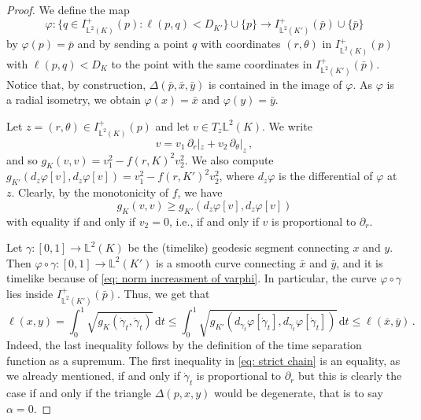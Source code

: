 \documentclass[hidelinks,12pt,a4paper]{article}
\numberwithin{equation}{section}
\theoremstyle{plain}
\theoremstyle{definition}
\renewcommand{\d}{\,\mathrm{d}}
\newcommand{\p}{\partial}
\newcommand{\lm}[1]{\mathbb{L}^2(#1)}
\newcommand*{\bx}{\bar{x}}
\newcommand*{\by}{\bar{y}}
\newcommand*{\bp}{\bar{p}}
\renewcommand{\d}{\,\mathrm{d}}
\begin{document}
\begin{proof}
We define the map 
\begin{equation*}
\varphi: \{q \in I^+_{\lm{K}}(p) : \ell(p,q) < D_{K'}\} \cup \{p\}  \to I^+_{\lm{K'}}(\bp) \cup \{\bp\}
\end{equation*}
by $\varphi(p)=\bp$ and by sending a point $q$ with coordinates $(r,\theta)$ in $I^+_{\lm{K}}(p)$ with $\ell(p,q) < D_{K}$ to the point with the same coordinates in $I^+_{\lm{K'}}(\bp)$. 
Notice that, by construction, $\Delta(\bp,\bx,\by)$ is contained in the image of $\varphi$. 
As $\varphi$ is a radial isometry, we obtain $\varphi(x)=\bx$ and $\varphi(y)=\by$. 

Let $z= (r, \theta) \in I^+_{\lm{K}}(p)$ and let $v \in T_z\lm{K}$. We write
\[
v=v_1 \, \partial_r |_{z} + v_2 \, \partial_{\theta} |_z \, ,
\]
and so $g_K(v,v) = v_1^2 - f(r,K)^2v_2^2$. 
We also compute $g_{K'}(d_z \varphi [v], d_z \varphi [v]) = v_1^2 - f(r,K')^2v_2^2$, where $d_z \varphi$ is the differential of $\varphi$ at $z$. 
Clearly, by the monotonicity of $f$, we have 
\begin{equation}
\label{eq: norm increasment of varphi}
g_K(v,v) \geq g_{K'}(d_z \varphi [v], d_z \varphi [v])
\end{equation}
with equality if and only if $v_2 =0$, i.e., if and only if $v$ is proportional to $\partial_r$.

Let $\gamma :[0,1] \rightarrow \lm{K}$ be the (timelike) geodesic segment connecting $x$ and $y$. Then $\varphi \circ \gamma : [0,1] \rightarrow \lm{K'}$ is a smooth curve connecting $\bx$ and $\by$, and it is timelike because of \eqref{eq: norm increasment of varphi}. In particular, the curve $\varphi \circ \gamma$ lies inside $I^+_{\lm{K'}}(\bp)$. 
Thus, we get that 
\begin{equation} \label{eq: strict chain}
\ell(x,y) = \int_0^1 \sqrt{g_K(\dot \gamma_t, \dot \gamma_t ) } \d t \leq \int_0^1 \sqrt{g_{K'}( d_{\gamma_t}\varphi [\dot \gamma_t], d_{\gamma_t}\varphi[\dot \gamma_t] ) } \d t \leq \ell(\bx,\by) \, .
\end{equation}
Indeed, the last inequality follows by the definition of the time separation function as a supremum.
The first inequality in \eqref{eq: strict chain} is an equality, as we already mentioned, if and only if $\dot \gamma_t$ is proportional to $\partial_r$ but this is clearly the case if and only if the triangle $\Delta(p,x,y)$ would be degenerate, that is to say $\alpha=0$. 
\end{proof}
\end{document}
